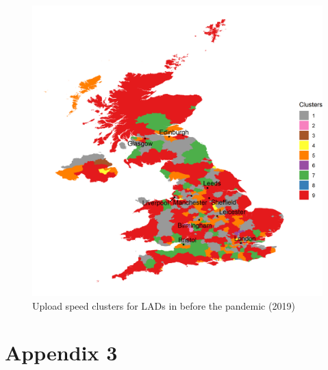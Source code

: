 \documentclass[]{interact}
\theoremstyle{plain}%
\theoremstyle{definition}
\theoremstyle{remark}
\begin{document}
\begin{figure}
\includegraphics[width=1\linewidth]{figures/map.up.2019.clusters} \caption{\label{map.up.2019.clusters}Upload speed clusters for LADs in before the pandemic (2019)}\label{fig:unnamed-chunk-17}
\end{figure}

\pagebreak

\hypertarget{appendix3}{%
\section*{Appendix 3}\label{appendix3}}
\end{document}
